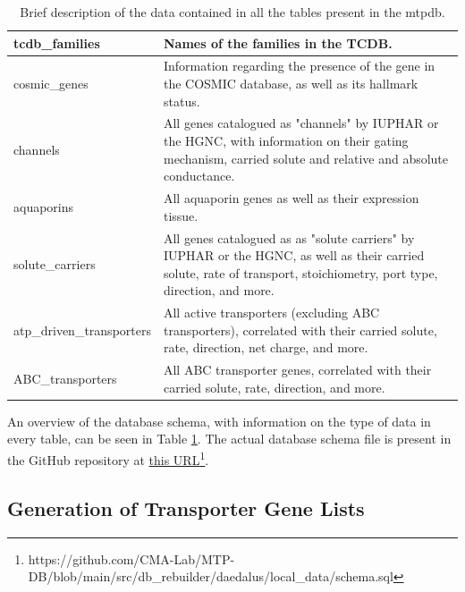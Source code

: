 \begin{table}
\begin{tabularx}{\textwidth}{|l|X|}
tcdb\_families            & Names of the families in the TCDB.                                                                                                                                  \\ \hline
cosmic\_genes             & Information regarding the presence of the gene in the COSMIC database, as well as its hallmark status.                                                              \\ \hline
channels                  & All genes catalogued as "channels" by IUPHAR or the HGNC, with information on their gating mechanism, carried solute and relative and absolute conductance.         \\ \hline
aquaporins                & All aquaporin genes as well as their expression tissue.                                                                                                             \\ \hline
solute\_carriers          & All genes catalogued as as "solute carriers" by IUPHAR or the HGNC, as well as their carried solute, rate of transport, stoichiometry, port type, direction, and more. \\ \hline
atp\_driven\_transporters & All active transporters (excluding ABC transporters), correlated with their carried solute, rate, direction, net charge, and more.                                  \\ \hline
ABC\_transporters         & All ABC transporter genes, correlated with their carried solute, rate, direction, and more.                                                                         \\ \hline
\end{tabularx}%
\caption{Brief description of the data contained in all the tables present in the \gls{mtpdb}.}
\label{tab:databaseSchema}
\end{table}

An overview of the database schema, with information on the type of data in every table, can be seen in Table \ref{tab:databaseSchema}. The actual database schema file is present in the GitHub repository at \href{https://github.com/CMA-Lab/MTP-DB/blob/main/src/db_rebuilder/daedalus/local_data/schema.sql}{this URL}\footnote{https://github.com/CMA-Lab/MTP-DB/blob/main/src/db\_rebuilder/daedalus/local\_data/schema.sql}.

\subsection{Generation of Transporter Gene Lists}


